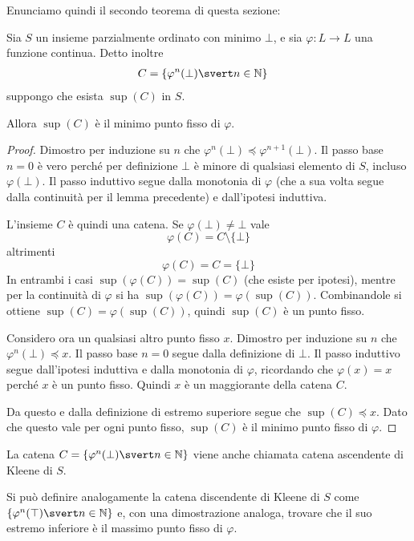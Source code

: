 \documentclass[12pt]{article}
\numberwithin{theorem}{subsection}
\newcommand{\setN}{\mathbb{N}}
\begin{document}
Enunciamo quindi il secondo teorema di questa sezione:
\begin{prop}
	Sia $S$ un insieme parzialmente ordinato con minimo $\bot$, e sia $\varphi: L \rightarrow L$ una funzione continua. Detto inoltre
	\begin{align*}
		C &= \left\lbrace \varphi^n (\bot) \svert n \in \setN \right\rbrace
	\end{align*}
	suppongo che esista $\sup(C)$ in $S$.
	
	Allora $\sup(C)$ è il minimo punto fisso di $\varphi$.
\end{prop}
\begin{proof}
	Dimostro per induzione su $n$ che $\varphi^n(\bot) \preceq \varphi^{n+1}(\bot)$. Il passo base $n = 0$ è vero perché per definizione $\bot$ è minore di qualsiasi elemento di $S$, incluso $\varphi(\bot)$. Il passo induttivo segue dalla monotonia di $\varphi$ (che a sua volta segue dalla continuità per il lemma precedente) e dall'ipotesi induttiva.

	L'insieme $C$ è quindi una catena. Se $\varphi(\bot) \neq \bot$ vale
	\[
	\varphi(C) = C \setminus \{ \bot \}
	\]
	altrimenti
	\[
	\varphi(C) = C = \{ \bot \}
	\]
	In entrambi i casi $\sup(\varphi(C)) = \sup(C)$ (che esiste per ipotesi), mentre per la continuità di $\varphi$ si ha $\sup(\varphi(C)) = \varphi(\sup(C))$. Combinandole si ottiene $\sup(C) = \varphi(\sup(C))$, quindi $\sup(C)$ è un punto fisso.
	
	Considero ora un qualsiasi altro punto fisso $x$. Dimostro per induzione su $n$ che $\varphi^n(\bot) \preceq x$. Il passo base $n = 0$ segue dalla definizione di $\bot$.
	Il passo induttivo segue dall'ipotesi induttiva e dalla monotonia di $\varphi$, ricordando che $\varphi(x) = x$ perché $x$ è un punto fisso.
	Quindi $x$ è un maggiorante della catena $C$.
	
	Da questo e dalla definizione di estremo superiore segue che $\sup(C) \preceq x$. Dato che questo vale per ogni punto fisso, $\sup(C)$ è il minimo punto fisso di $\varphi$.
\end{proof}

La catena $C = \left\lbrace \varphi^n (\bot) \svert n \in \setN \right\rbrace$ viene anche chiamata catena ascendente di Kleene di $S$.

Si può definire analogamente la catena discendente di Kleene di $S$ come $\left\lbrace \varphi^n (\top) \svert n \in \setN \right\rbrace$ e, con una dimostrazione analoga, trovare che il suo estremo inferiore è il massimo punto fisso di $\varphi$.
\end{document}
